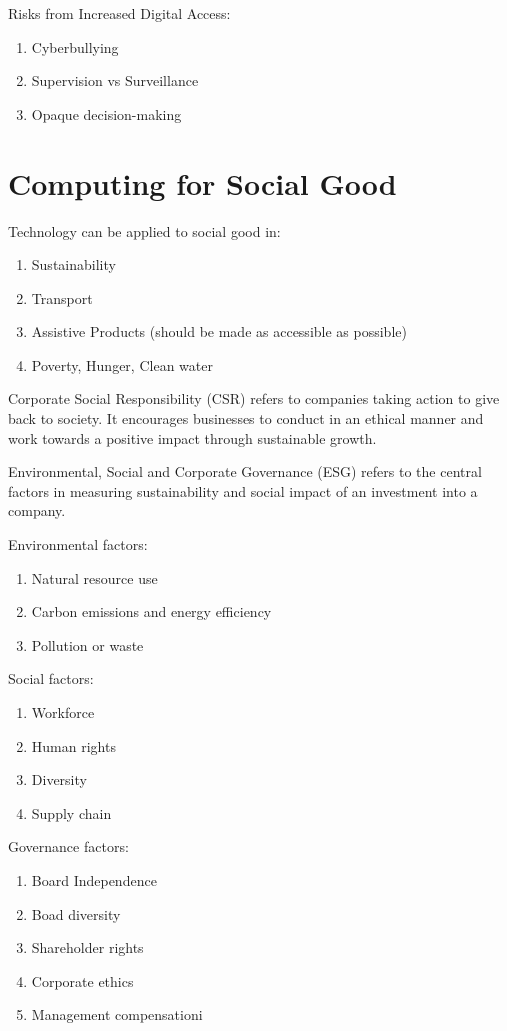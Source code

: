 \documentclass[12pt, a4paper]{article}
\begin{document}
\begin{multicols*}{3}
Risks from Increased Digital Access:
\begin{enumerate}[\roman*.]
  \item Cyberbullying
  \item Supervision vs Surveillance
  \item Opaque decision-making
\end{enumerate}

\section{Computing for Social Good}
Technology can be applied to social good in:
\begin{enumerate}[\roman*.]
  \item Sustainability
  \item Transport
  \item Assistive Products (should be made as accessible as possible)
  \item Poverty, Hunger, Clean water
\end{enumerate}

Corporate Social Responsibility (CSR) refers to companies taking action to give back to society. It encourages businesses to conduct in an ethical manner and work towards a positive impact through sustainable growth.

Environmental, Social and Corporate Governance (ESG) refers to the central factors in measuring sustainability and social impact of an investment into a company.

Environmental factors:
\begin{enumerate}[\roman*.]
  \item Natural resource use 
  \item Carbon emissions and energy efficiency
  \item Pollution or waste
\end{enumerate}

Social factors:
\begin{enumerate}[\roman*.]
  \item Workforce 
  \item Human rights 
  \item Diversity
  \item Supply chain
\end{enumerate}

Governance factors:
\begin{enumerate}[\roman*.]
  \item Board Independence
  \item Boad diversity 
  \item Shareholder rights 
  \item Corporate ethics 
  \item Management compensationi
\end{enumerate}
\colbreak 


\end{multicols*}
\end{document}
